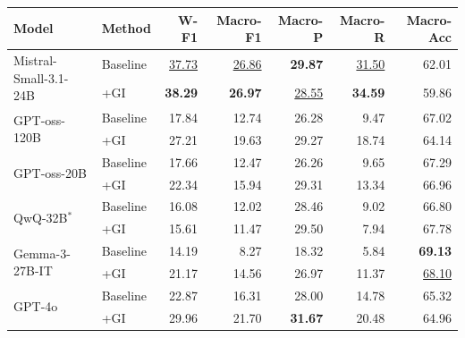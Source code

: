 \begin{table}[t]
\centering
\small
\setlength{\tabcolsep}{6pt}
\renewcommand{\arraystretch}{1.2}
\begin{tabular}{l l rrrrr}
\toprule
\textbf{Model} & \textbf{Method} & \textbf{W-F1} & \textbf{Macro-F1} & \textbf{Macro-P} & \textbf{Macro-R} & \textbf{Macro-Acc} \\
\midrule
\multirow{2}{*}{Mistral-Small-3.1-24B}
  & Baseline & \underline{37.73}  & \underline{26.86}  & \textbf{29.87}     & \underline{31.50}  & 62.01              \\
  & +GI      & \textbf{38.29}     & \textbf{26.97}     & \underline{28.55}  & \textbf{34.59}     & 59.86              \\[3pt]
\multirow{2}{*}{GPT-oss-120B}
  & Baseline & 17.84              & 12.74              & 26.28              &  9.47              & 67.02              \\
  & +GI      & 27.21              & 19.63              & 29.27              & 18.74              & 64.14              \\[3pt]
\multirow{2}{*}{GPT-oss-20B}
  & Baseline & 17.66              & 12.47              & 26.26              &  9.65              & 67.29              \\
  & +GI      & 22.34              & 15.94              & 29.31              & 13.34              & 66.96              \\[3pt]
\multirow{2}{*}{QwQ-32B$^{*}$}
  & Baseline & 16.08              & 12.02              & 28.46              &  9.02              & 66.80              \\
  & +GI      & 15.61              & 11.47              & 29.50              &  7.94              & 67.78              \\[3pt]
\multirow{2}{*}{Gemma-3-27B-IT}
  & Baseline & 14.19              &  8.27              & 18.32              &  5.84              & \textbf{69.13}     \\
  & +GI      & 21.17              & 14.56              & 26.97              & 11.37              & \underline{68.10}  \\
\midrule
\multirow{2}{*}{GPT-4o}
  & Baseline & 22.87              & 16.31              & 28.00              & 14.78              & 65.32              \\
  & +GI      & 29.96              & 21.70              & \textbf{31.67}     & 20.48              & 64.96              \\
\bottomrule
\end{tabular}

\end{table}

